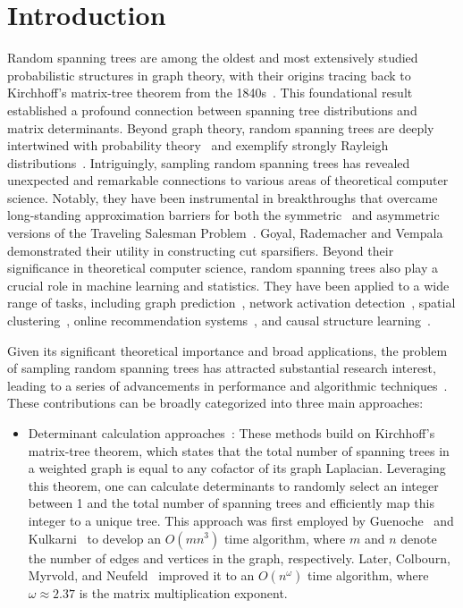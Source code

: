 \documentclass[11pt]{article}
\begin{document}
{\section{Introduction}
 Random spanning trees are among the oldest and most extensively studied probabilistic structures in graph theory, with their origins tracing back to Kirchhoff’s matrix-tree theorem from the 1840s~\cite{kirchhoff1847ueber}. This foundational result established a profound connection between spanning tree distributions and matrix determinants. Beyond graph theory, random spanning trees are deeply intertwined with probability theory~\cite{lyons2017probability} and exemplify strongly Rayleigh distributions~\cite{borcea2009negative}. Intriguingly, sampling random spanning trees has revealed unexpected and remarkable connections to various areas of theoretical computer science. Notably, they have been instrumental in breakthroughs that overcame long-standing approximation barriers for both the symmetric~\cite{gharan2011randomized} and asymmetric versions of the Traveling Salesman Problem~\cite{asadpour2010log}. Goyal, Rademacher and Vempala~\cite{goyal2009expanders} demonstrated their utility in constructing cut sparsifiers.
 Beyond their significance in theoretical computer science, random spanning trees also play a crucial role in machine learning and statistics. 
 They have been applied to a wide range of tasks, including graph prediction~\cite{cesa2013random}, network activation detection~\cite{sharpnack2013detecting}, spatial clustering~\cite{teixeira2019bayesian}, online recommendation systems~\cite{herbster2021gang}, and causal structure learning~\cite{duan2023low,richter2023improved}.

Given its significant theoretical importance and broad applications, the problem of sampling random spanning trees has attracted substantial research interest, leading to a series of advancements in performance and algorithmic techniques~\cite{guenoche1983random, broder1989generating, aldous1990random, kulkarni1990generating, wilson1996generating, colbourn1996two, kelner2009faster, madry2014fast, harvey2016generating, durfee2017sampling, durfee2017determinant, schild2018almost, anari2021log}. These contributions can be broadly categorized into three main approaches:


\begin{itemize}
	\item Determinant calculation approaches~\cite{guenoche1983random, kulkarni1990generating, colbourn1996two}: These methods build on Kirchhoff’s matrix-tree theorem, which states that the total number of spanning trees in a weighted graph is equal to any cofactor of its graph Laplacian. Leveraging this theorem, one can calculate determinants to randomly select an integer between 1 and the total number of spanning trees and efficiently map this integer to a unique tree. This approach was first employed by Guenoche~\cite{guenoche1983random} and Kulkarni~\cite{kulkarni1990generating} to develop an $O(mn^3)$ time algorithm,  where $m$ and $n$ denote the number of edges and vertices in the graph, respectively. Later, Colbourn, Myrvold, and Neufeld~\cite{colbourn1996two} improved it to an $O(n^\omega)$ time algorithm, where $\omega \approx 2.37$ is the matrix multiplication exponent.


\end{itemize}}
\end{document}
